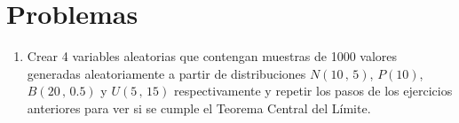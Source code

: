 \documentclass[a4paper]{article}
\begin{document}
\section*{Problemas}
\begin{enumerate}[leftmargin=*]

\item Crear 4 variables aleatorias que contengan muestras de 1000 valores generadas aleatoriamente a partir de distribuciones $N(10\,,\,5)$, $P(10)$, $B(20\,,\,0.5)$ y $U(5\,,\,15)$ respectivamente y repetir los pasos de los ejercicios anteriores para ver si se cumple el Teorema Central del Límite.

\end{enumerate}
\end{document}
